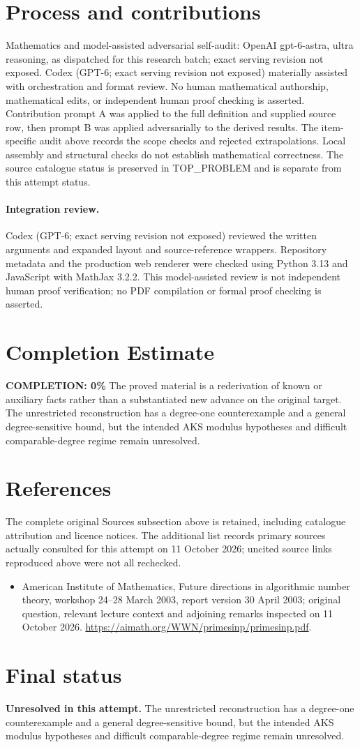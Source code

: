\documentclass[11pt]{article}
\begin{document}
\section{Process and contributions}
Mathematics and model-assisted adversarial self-audit: OpenAI gpt-6-astra, ultra reasoning, as dispatched for this research batch; exact serving revision not exposed. Codex (GPT-6; exact serving revision not exposed) materially assisted with orchestration and format review. No human mathematical authorship, mathematical edits, or independent human proof checking is asserted.
Contribution prompt A was applied to the full definition and supplied source row, then prompt B was applied adversarially to the derived results. The item-specific audit above records the scope checks and rejected extrapolations. Local assembly and structural checks do not establish mathematical correctness. The source catalogue status is preserved in TOP\_PROBLEM and is separate from this attempt status.
\paragraph{Integration review.} Codex (GPT-6; exact serving revision not exposed) reviewed the written arguments and expanded layout and source-reference wrappers. Repository metadata and the production web renderer were checked using Python 3.13 and JavaScript with MathJax 3.2.2. This model-assisted review is not independent human proof verification; no PDF compilation or formal proof checking is asserted.

\section{Completion Estimate}
\noindent\textbf{COMPLETION: 0\%}
The proved material is a rederivation of known or auxiliary facts rather than a substantiated new advance on the original target. The unrestricted reconstruction has a degree-one counterexample and a general degree-sensitive bound, but the intended AKS modulus hypotheses and difficult comparable-degree regime remain unresolved.
\section{References}
The complete original Sources subsection above is retained, including catalogue attribution and licence notices. The additional list records primary sources actually consulted for this attempt on 11 October 2026; uncited source links reproduced above were not all rechecked.
\begin{itemize}
\item American Institute of Mathematics, Future directions in algorithmic number theory, workshop 24--28 March 2003, report version 30 April 2003; original question, relevant lecture context and adjoining remarks inspected on 11 October 2026. \url{https://aimath.org/WWN/primesinp/primesinp.pdf}.
\end{itemize}
\section{Final status}
\textbf{Unresolved in this attempt.} The unrestricted reconstruction has a degree-one counterexample and a general degree-sensitive bound, but the intended AKS modulus hypotheses and difficult comparable-degree regime remain unresolved.
\end{document}
